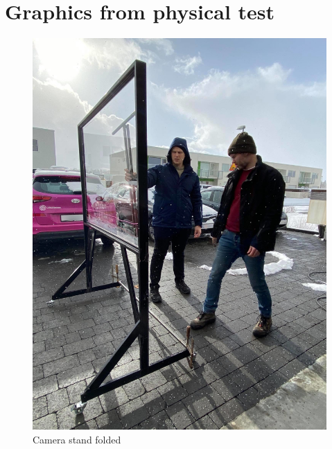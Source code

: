 \documentclass[a4paper]{jpconf}
\begin{document}
\section{Graphics from physical test}\label{PhysicalTestPic}
\begin{figure}[H]
	\centering
	\includegraphics[width=1\linewidth]{graphicsFromGardabae/FoldingLightBord.jpg}
	\caption{Camera stand folded}
	\label{fig:fold}
\end{figure}
\end{document}
